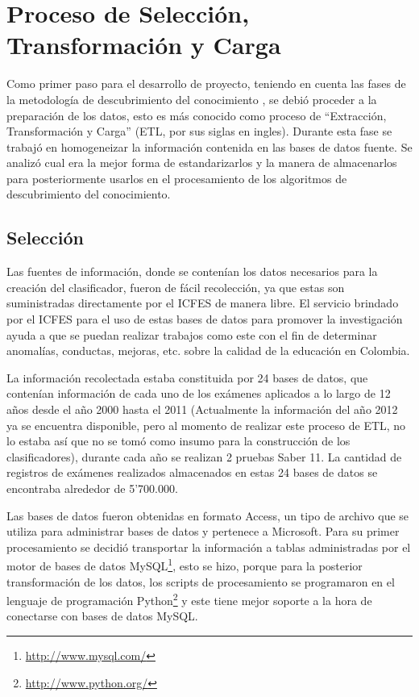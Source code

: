 \chapter{Proceso de Selección, Transformación y Carga}
Como primer paso para el desarrollo de proyecto, teniendo en cuenta las fases de la metodología de descubrimiento del conocimiento \cite{key-50}, se debió proceder a la preparación de los datos, esto es más conocido como proceso de “Extracción, Transformación y Carga” (ETL, por sus siglas en ingles). Durante esta fase se trabajó en homogeneizar la información contenida en las bases de datos fuente. Se analizó cual era la mejor forma de estandarizarlos y la manera de almacenarlos para posteriormente usarlos en el procesamiento de los algoritmos de descubrimiento del conocimiento.
\section{Selección}
Las fuentes de información, donde se contenían los datos necesarios para la creación del clasificador, fueron de fácil recolección, ya que estas son suministradas directamente por el ICFES de manera libre.
El servicio brindado por el ICFES para el uso de estas bases de datos para promover la investigación ayuda a que se puedan realizar trabajos como este con el fin de determinar anomalías, conductas, mejoras, etc. sobre la calidad de la educación en Colombia.

La información recolectada estaba constituida por 24 bases de datos, que contenían información de cada uno de los exámenes aplicados a lo largo de 12 años desde el año 2000 hasta el 2011 (Actualmente la información del año 2012 ya se encuentra disponible, pero al momento de realizar este proceso de ETL, no lo estaba así que no se tomó como insumo para la construcción de los clasificadores), durante cada año se realizan 2 pruebas Saber 11\degree. La cantidad de registros de exámenes realizados almacenados en estas 24 bases de datos se encontraba alrededor de 5’700.000.

Las bases de datos fueron obtenidas en formato Access, un tipo de archivo que se utiliza para administrar bases de datos y pertenece a Microsoft. Para su primer procesamiento se decidió transportar la información a tablas administradas por el motor de bases de datos MySQL\footnote{\url{http://www.mysql.com/}}, esto se hizo, porque para la posterior transformación de los datos, los scripts de procesamiento se programaron en el lenguaje de programación Python\footnote{\url{http://www.python.org/}} y este tiene mejor soporte a la hora de conectarse con bases de datos MySQL.
